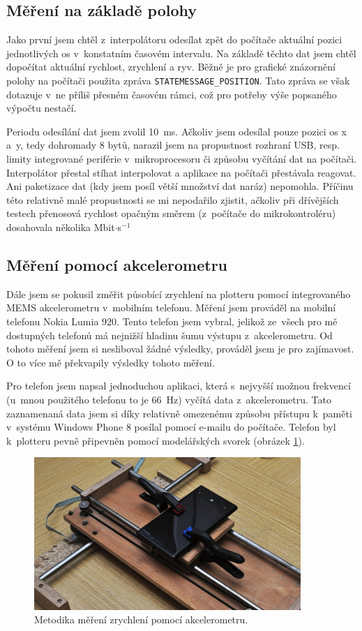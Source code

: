 	\subsection{Měření na základě polohy}
	Jako první jsem chtěl z~interpolátoru odesílat zpět do počítače aktuální pozici jednotlivých os v~konstatním časovém intervalu. Na základě těchto dat jsem chtěl dopočítat aktuální rychlost, zrychlení a ryv. Běžně je pro grafické znázornění polohy na počítači použita zpráva {\tt STATEMESSAGE\_POSITION}. Tato zpráva se však dotazuje v~ne příliš přesném časovém rámci, což pro potřeby výše popsaného výpočtu nestačí.
	
	Periodu odesílání dat jsem zvolil 10~ms. Ačkoliv jsem odesílal pouze pozici os x a~y, tedy dohromady 8 bytů, narazil jsem na propustnost rozhraní USB, resp. limity integrované periférie v~mikroprocesoru či způsobu vyčítání dat na počítači. Interpolátor přestal stíhat interpolovat a aplikace na počítači přestávala reagovat. Ani paketizace dat (kdy jsem posíl větší množství dat naráz) nepomohla. Příčinu této relativně malé propustnosti se mi nepodařilo zjistit, ačkoliv při dřívějších testech přenosová rychlost opačným směrem (z~počítače do mikrokontroléru) dosahovala několika Mbit$\cdot$s$^{-1}$ 
	
	\subsection{Měření pomocí akcelerometru}
	Dále jsem se pokusil změřit působící zrychlení na plotteru pomocí integrovaného MEMS akcelerometru v~mobilním telefonu. Měření jsem prováděl na mobilní telefonu Nokia Lumia 920. Tento telefon jsem vybral, jelikož ze~všech pro mě dostupných telefonů má nejnižší hladinu šumu výstupu z~akcelerometru. Od tohoto měření jsem si nesliboval žádné výsledky, prováděl jsem je pro zajímavost. O to více mě překvapily výsledky tohoto měření.
	
	Pro telefon jsem napsal jednoduchou aplikaci, která s~nejvyšší možnou frekvencí (u~mnou použitého telefonu to je 66~Hz) vyčítá data z~akcelerometru. Tato zaznamenaná data jsem si díky relativně omezenému způsobu přístupu k~paměti v~systému Windows Phone 8 posílal pomocí e-mailu do počítače. Telefon byl k~plotteru pevně připevněn pomocí modelářských svorek (obrázek \ref{obr:met1}).
	
	\begin{figure}[h]
		\centering
		\includegraphics[width=0.9\textwidth]{img/metodika1.jpg}
		\caption{Metodika měření zrychlení pomocí akcelerometru.}\label{obr:met1}	
	\end{figure}
	
